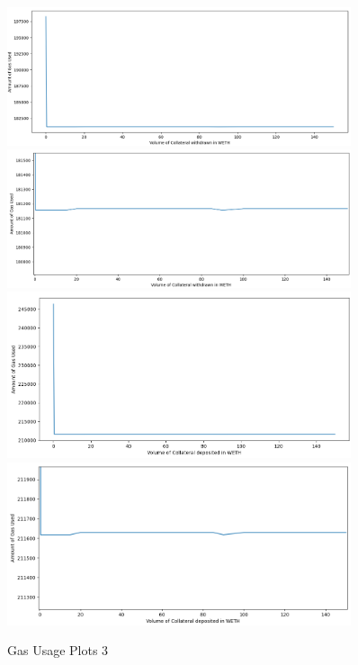 \begin{figure}[!htb]
    \centering
    \includegraphics[width=0.9\textwidth]{project/Images/withdrawFeesPlot1.png}\\
    \includegraphics[width=0.9\textwidth]{project/Images/withdrawFeesPlot2.png}\\
    \includegraphics[width=0.9\textwidth]{project/Images/depositFeesPlot1.png}\\
    \includegraphics[width=0.9\textwidth]{project/Images/depositFeesPlot2.png}
    \caption{Gas Usage Plots 3 \label{fig:gasPlots3}}
\end{figure}

